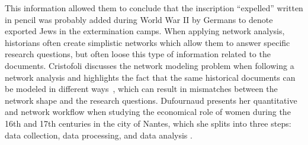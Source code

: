 This information  allowed them to conclude that the inscription ``expelled'' written in pencil was probably added during World War II by Germans to denote exported Jews in the extermination camps.
When applying network analysis, historians often create simplistic networks which allow them to answer specific research questions, but often loose this type of information related to the documents.
Cristofoli discusses the network modeling problem when following a network analysis and highlights the fact that the same historical documents can be modeled in different ways~\cite{cristofoliAuxSourcesGrands2008}, which can result in mismatches between the network shape and the research questions.
Dufournaud presents her quantitative and network workflow when studying the economical role of women during the 16th and 17th centuries in the city of Nantes, which she splits into three steps: data collection, data processing, and data analysis \cite{dufournaudCommentRendreVisible2018}.







